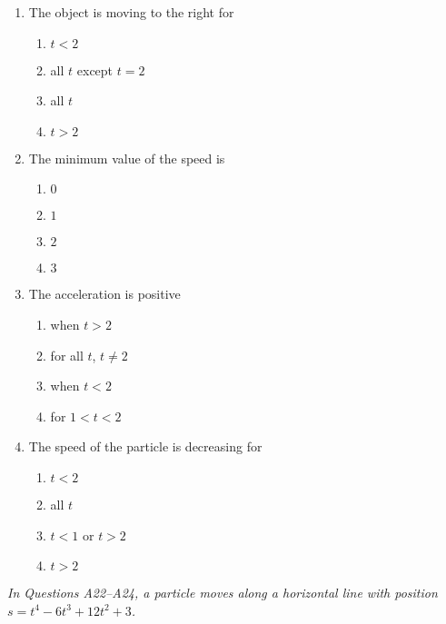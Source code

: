\documentclass[12pt]{article}
\begin{document}
\begin{enumerate}[label=\textbf{A\arabic*.},resume]

\item The object is moving to the right for
\begin{enumerate}[label=(\Alph*)]
\item $t<2$ \item all $t$ except $t=2$ \item all $t$ \item $t>2$
\end{enumerate}

\item The minimum value of the speed is
\begin{enumerate}[label=(\Alph*)]
\item $0$ \item $1$ \item $2$ \item $3$
\end{enumerate}

\item The acceleration is positive
\begin{enumerate}[label=(\Alph*)]
\item when $t>2$ \item for all $t$, $t\ne 2$ \item when $t<2$ \item for $1<t<2$
\end{enumerate}

\item The speed of the particle is decreasing for
\begin{enumerate}[label=(\Alph*)]
\item $t<2$ \item all $t$ \item $t<1$ or $t>2$ \item $t>2$
\end{enumerate}

\end{enumerate}

\medskip\noindent\textit{In Questions A22–A24, a particle moves along a horizontal line with position $s=t^{4}-6t^{3}+12t^{2}+3$.}
\end{document}
